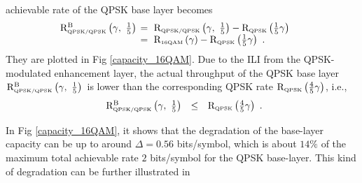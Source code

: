 \documentclass[10pt,fleqn, twocolumn]{IEEEtran}
\begin{document}
achievable rate of the QPSK base layer becomes
\begin{equation}\hspace{-0.2in}
\begin{array}{rl}
{\rm R}_{\mbox{\tiny QPSK/QPSK}}^{\rm B}\left(\gamma,\
\frac{1}{5}\right)&\hspace{-0.08in}=\ {\rm R}_{\mbox{\tiny
QPSK/QPSK}}\left(\gamma,\
\frac{1}{5}\right)-{\rm R}_{\mbox{\tiny QPSK}} \left(\frac{1}{5}\gamma\right)\\
&\hspace{-0.08in}=\ {\rm R}_{\mbox{\tiny
16QAM}}\left(\gamma\right)-{\rm R}_{\mbox{\tiny
QPSK}}\left(\frac{1}{5}\gamma\right)\ .
\end{array}\label{R_16QAM_B1}
\end{equation}
\noindent They are plotted in Fig \ref{capacity_16QAM}. Due to the
ILI from the QPSK-modulated enhancement layer, the actual
throughput of the QPSK base layer ${\rm R}_{\mbox{\tiny
QPSK/QPSK}}^{\rm B}\left(\gamma,\ \frac{1}{5} \right)$ is lower
than the corresponding QPSK rate ${\rm R}_{\mbox{\tiny
QPSK}}\left(\frac{4}{5}\gamma\right)$, i.e.,
\begin{equation}
\begin{array}{rcl}
{\rm R}_{\mbox{\tiny QPSK/QPSK}}^{\rm B}\left(\gamma,\ \frac{1}{5}
\right)&\leq&{\rm R}_{\mbox{\tiny QPSK}}
\left(\frac{4}{5}\gamma\right)
\end{array}.\label{R_16QAM_B2}
\end{equation}
\begin{figure}
\end{figure}
\noindent In Fig \ref{capacity_16QAM}, it shows that the
degradation of the base-layer capacity can be up to around
$\Delta=0.56$ bits/symbol, which is about $14\%$ of the maximum
total achievable rate $2$ bits/symbol for the QPSK base-layer.
This kind of degradation can be further illustrated in
\end{document}
